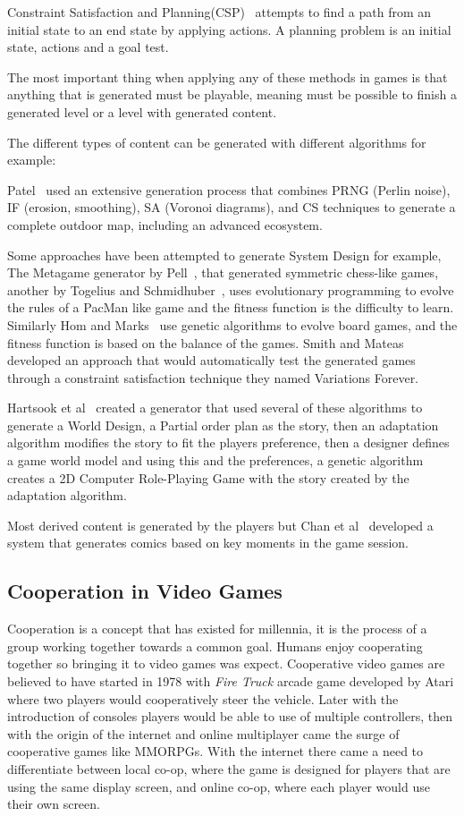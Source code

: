 \documentclass[runningheads]{llncs}
\begin{document}
Constraint Satisfaction and Planning(CSP)~\cite{ref_russel} attempts to find a path from an initial state to an end state by applying actions. A planning problem is an initial state, actions and a goal test.

The most important thing when applying any of these methods in games is that anything that is generated must be playable, meaning must be possible to finish a generated level or a level with generated content.

The different types of content can be generated with different algorithms for example:

Patel~\cite{ref_patel} used an extensive generation process that combines PRNG (Perlin noise), IF (erosion, smoothing), SA (Voronoi diagrams), and CS techniques to generate a complete outdoor map, including an advanced ecosystem.

Some approaches have been attempted to generate System Design for example, The Metagame generator by Pell~\cite{ref_pell}, that generated symmetric chess-like games, another by Togelius and Schmidhuber~\cite{ref_schmidhuber}, uses evolutionary programming to evolve the rules of a PacMan like game and the fitness function is the difficulty to learn. Similarly Hom and Marks~\cite{ref_hom} use genetic algorithms to evolve board games, and the fitness function is based on the balance of the games. Smith and Mateas~\cite{ref_mateas} developed an approach that would automatically test the generated games through a constraint satisfaction technique they named Variations Forever.

Hartsook et al~\cite{ref_hartsook} created a generator that used several of these algorithms to generate a World Design, a Partial order plan as the story, then an adaptation algorithm modifies the story to fit the players preference, then a designer defines a game world model and using this and the preferences, a genetic algorithm creates a 2D Computer Role-Playing Game with the story created by the adaptation algorithm.

Most derived content is generated by the players but Chan et al~\cite{ref_chan} developed a system that generates comics based on key moments in the game session.

\subsection{Cooperation in Video Games}

Cooperation is a concept that has existed for millennia, it is the process of a group working together towards a common goal. Humans enjoy cooperating together so bringing it to video games was expect. Cooperative video games are believed to have started in 1978 with \textit{Fire Truck} arcade game developed by Atari where two players would cooperatively steer the vehicle. Later with the introduction of consoles players would be able to use of multiple controllers, then with the origin of the internet and online multiplayer came the surge of cooperative games like MMORPGs. With the internet there came a need to differentiate between local co-op, where the game is designed for players that are using the same display screen, and online co-op, where each player would use their own screen.
\end{document}
